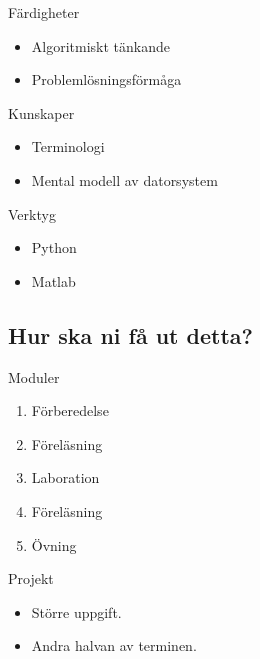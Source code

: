 \begin{frame}
  \begin{block}{Färdigheter}
    \begin{itemize}
      \item Algoritmiskt tänkande
      \item Problemlösningsförmåga
    \end{itemize}
  \end{block}

  \pause

  \begin{block}{Kunskaper}
    \begin{itemize}
      \item Terminologi
      \item Mental modell av datorsystem
    \end{itemize}
  \end{block}

  \pause

  \begin{block}{Verktyg}
    \begin{itemize}
      \item Python
      \item Matlab
    \end{itemize}
  \end{block}
\end{frame}

\subsection{Hur ska ni få ut detta?}

\begin{frame}
  \begin{block}{Moduler}
    \begin{enumerate}
      \item Förberedelse
      \item Föreläsning
      \item Laboration
      \item Föreläsning
      \item Övning
    \end{enumerate}
  \end{block}

  \pause

  \begin{block}{Projekt}
    \begin{itemize}
      \item Större uppgift.
      \item Andra halvan av terminen.
    \end{itemize}
  \end{block}
\end{frame}

